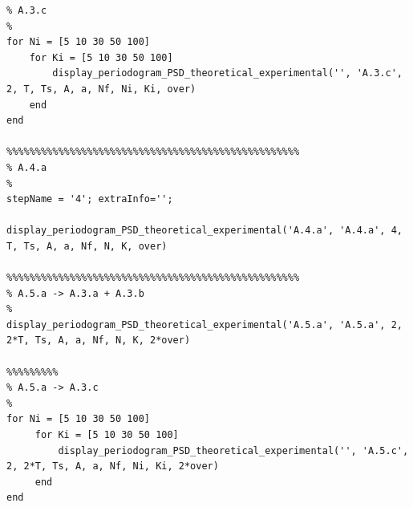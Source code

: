 \documentclass[11pt]{article}
\begin{document}
\begin{lstlisting}[caption = {\texttt{part\_a.m}}]
%%%%%%%%%%%%%%%%%%%%%%%%%%%%%%%%%%%%%%%%%%%%%%%%%%%
% A.3.c
%
for Ni = [5 10 30 50 100] 
    for Ki = [5 10 30 50 100]
        display_periodogram_PSD_theoretical_experimental('', 'A.3.c', 2, T, Ts, A, a, Nf, Ni, Ki, over)
    end
end

%%%%%%%%%%%%%%%%%%%%%%%%%%%%%%%%%%%%%%%%%%%%%%%%%%%
% A.4.a
%
stepName = '4'; extraInfo='';

display_periodogram_PSD_theoretical_experimental('A.4.a', 'A.4.a', 4, T, Ts, A, a, Nf, N, K, over)

%%%%%%%%%%%%%%%%%%%%%%%%%%%%%%%%%%%%%%%%%%%%%%%%%%%
% A.5.a -> A.3.a + A.3.b 
%
display_periodogram_PSD_theoretical_experimental('A.5.a', 'A.5.a', 2, 2*T, Ts, A, a, Nf, N, K, 2*over)

%%%%%%%%%
% A.5.a -> A.3.c
%
for Ni = [5 10 30 50 100] 
     for Ki = [5 10 30 50 100]
         display_periodogram_PSD_theoretical_experimental('', 'A.5.c', 2, 2*T, Ts, A, a, Nf, Ni, Ki, 2*over)
     end
end
\end{lstlisting}

\begin{lstlisting}[caption = {\texttt{part\_b.m}}]

\end{lstlisting}
\end{document}
